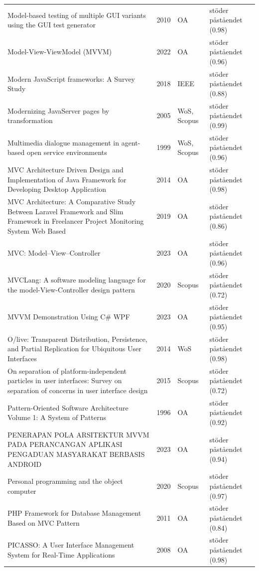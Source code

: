 \begin{longtable}{@{}%
  >{\raggedright\arraybackslash}p{}c%
  >{\raggedright\arraybackslash}p{}%
  >{\raggedright\arraybackslash}p{}@{}}
Model-based testing of multiple GUI variants using the GUI test generator & 2010 & OA & stöder påståendet (0.98) \\
Model-View-ViewModel (MVVM) & 2022 & OA & stöder påståendet (0.96) \\
Modern JavaScript frameworks: A Survey Study & 2018 & IEEE & stöder påståendet (0.88) \\
Modernizing JavaServer pages by transformation & 2005 & WoS, Scopus & stöder påståendet (0.99) \\
Multimedia dialogue management in agent-based open service environments & 1999 & WoS, Scopus & stöder påståendet (0.96) \\
MVC Architecture Driven Design and Implementation of Java Framework for Developing Desktop Application & 2014 & OA & stöder påståendet (0.98) \\
MVC Architecture: A Comparative Study Between Laravel Framework and Slim Framework in Freelancer Project Monitoring System Web Based & 2019 & OA & stöder påståendet (0.86) \\
MVC: Model--View--Controller & 2023 & OA & stöder påståendet (0.96) \\
MVCLang: A software modeling language for the model-View-Controller design pattern & 2020 & Scopus & stöder påståendet (0.72) \\
MVVM Demonstration Using C\# WPF & 2023 & OA & stöder påståendet (0.95) \\
O/live: Transparent Distribution, Persistence, and Partial Replication for Ubiquitous User Interfaces & 2014 & WoS & stöder påståendet (0.98) \\
On separation of platform-independent particles in user interfaces: Survey on separation of concerns in user interface design & 2015 & Scopus & stöder påståendet (0.72) \\
Pattern-Oriented Software Architecture Volume 1: A System of Patterns & 1996 & OA & stöder påståendet (0.92) \\
PENERAPAN POLA ARSITEKTUR MVVM PADA PERANCANGAN APLIKASI PENGADUAN MASYARAKAT BERBASIS ANDROID & 2023 & OA & stöder påståendet (0.94) \\
Personal programming and the object computer & 2020 & Scopus & stöder påståendet (0.97) \\
PHP Framework for Database Management Based on MVC Pattern & 2011 & OA & stöder påståendet (0.84) \\
PICASSO: A User Interface Management System for Real-Time Applications & 2008 & OA & stöder påståendet (0.98) \\

\end{longtable}
